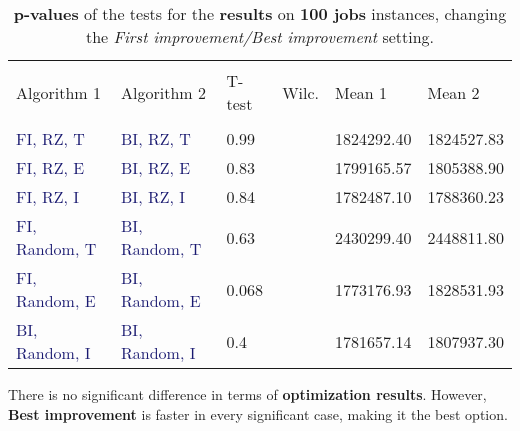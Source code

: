 \documentclass[
12pt,
a4paper,
oneside,
headinclude,
footinclude]{article}
\theoremstyle{definition} %
\begin{document}
\begin{table}[H]
    \begin{tabular}{l l l l l l} %
        \hline
        \hline 
        \\[-1.5ex]
        \textcolor{BrickRed}{Algorithm 1} & \textcolor{BrickRed}{Algorithm 2} & \textcolor{BrickRed}{T-test} & \textcolor{BrickRed}{Wilc.} & \textcolor{BrickRed}{Mean 1} & \textcolor{BrickRed}{Mean 2}\\ [0.5ex]
        \hline %
        \\[-1.5ex]
        \textcolor{MidnightBlue}{FI, RZ, T}     & \textcolor{MidnightBlue}{BI, RZ, T}     & 0.99 &  & 1824292.40 & 1824527.83 \\ 
        \textcolor{MidnightBlue}{FI, RZ, E}     & \textcolor{MidnightBlue}{BI, RZ, E}     & 0.83 &  & 1799165.57 & 1805388.90 \\ 
        \textcolor{MidnightBlue}{FI, RZ, I}     & \textcolor{MidnightBlue}{BI, RZ, I}     & 0.84 &  & 1782487.10 & 1788360.23 \\ 
        \textcolor{MidnightBlue}{FI, Random, T} & \textcolor{MidnightBlue}{BI, Random, T} & 0.63 &  &2430299.40 & 2448811.80 \\ 
        \textcolor{MidnightBlue}{FI, Random, E} & \textcolor{MidnightBlue}{BI, Random, E} & 0.068 &  & 1773176.93 & 1828531.93 \\ 
        \textcolor{MidnightBlue}{BI, Random, I} & \textcolor{MidnightBlue}{BI, Random, I} & 0.4 &  & 1781657.14 & 1807937.30 \\ 
        [1ex] %
        \hline %
    \end{tabular}
    \caption{\label{tab:ii-ty100res}\textbf{p-values} of the tests for the \textbf{results} on \textbf{100 jobs} instances, changing the \textit{First improvement/Best improvement} setting.}
\end{table} 

There is no significant difference in terms of \textbf{optimization results}. However, \textbf{Best improvement} is faster in every significant case, making it the best option.
\end{document}
